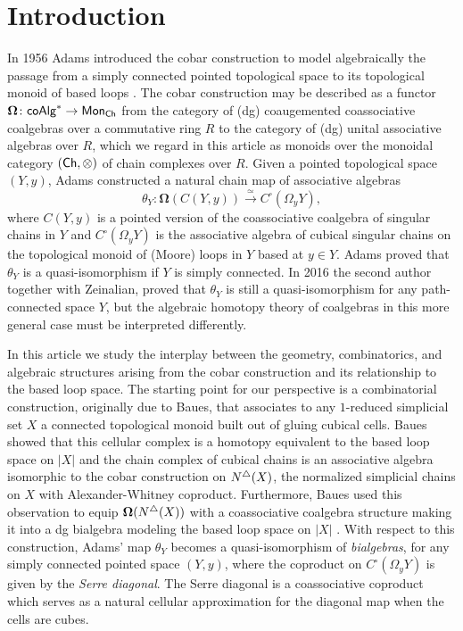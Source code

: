 
\section{Introduction}

In 1956 Adams introduced the cobar construction to model algebraically the passage from a simply connected pointed topological space to its topological monoid of based loops \cite{Adams}. The cobar construction may be described as a functor $\mathbf{\Omega} \colon \mathsf{coAlg}^* \to \mathsf{Mon}_{\mathsf{Ch}}$ from the category of (dg) coaugemented coassociative coalgebras over a commutative ring $R$ to the category of (dg) unital associative algebras over $R$, which we regard in this article as monoids over the monoidal category $(\mathsf{Ch}, \otimes) $ of chain complexes over $R$. Given a pointed topological space $(Y,y)$, Adams constructed a natural chain map of associative algebras
$$\theta_Y \colon \mathbf{\Omega}(C(Y,y)) \xrightarrow{\simeq} C^{\square}(\Omega_yY),$$ where $C(Y,y)$ is a pointed version of the coassociative coalgebra of singular chains in $Y$ and $C^{\square}(\Omega_yY)$ is the associative algebra of cubical singular chains on the topological monoid of (Moore) loops in $Y$ based at $y \in Y$. Adams proved that $\theta_Y$ is a quasi-isomorphism if $Y$ is simply connected. In 2016 the second author together with Zeinalian, proved that $\theta_Y$ is still a quasi-isomorphism for any path-connected space $Y$, but the algebraic homotopy theory of coalgebras in this more general case must be interpreted differently.

In this article we study the interplay between the geometry, combinatorics, and algebraic structures arising from the cobar construction and its relationship to the based loop space. The starting point for our perspective is a combinatorial construction, originally due to Baues, that associates to any $1$-reduced simplicial set $X$ a connected topological monoid built out of gluing cubical cells.  Baues showed that this cellular complex is a homotopy equivalent to the based loop space on $|X|$ and the chain complex of cubical chains is an associative algebra isomorphic to the cobar construction on $N^{\triangle}(X)$, the normalized simplicial chains on $X$ with Alexander-Whitney coproduct. Furthermore, Baues used this observation to equip $\mathbf{\Omega}( N^{\triangle} (X) )$ with a coassociative coalgebra structure making it into a dg bialgebra modeling the based loop space on $|X|$ \cite{Baues}.  With respect to this construction, Adams' map $\theta_Y$ becomes a quasi-isomorphism of \textit{bialgebras}, for any simply connected pointed space $(Y,y)$, where the coproduct on $C^{\square}(\Omega_yY)$ is given by the \textit{Serre diagonal}. The Serre diagonal is a coassociative coproduct which serves as a natural cellular approximation for the diagonal map when the cells are cubes. 

